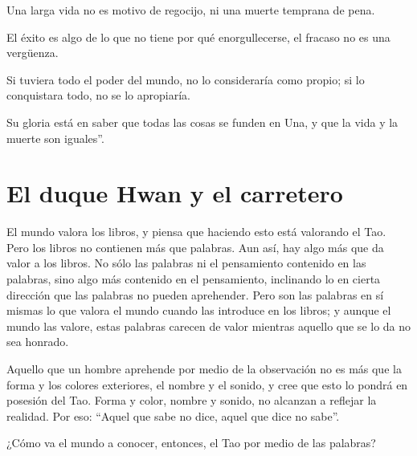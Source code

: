 \documentclass[hidelinks]{memoir}
\begin{document}
	Una larga vida no es motivo de regocijo, ni una muerte temprana de pena.
	
	El éxito es algo de lo que no tiene por qué enorgullecerse, el fracaso
	no es una vergüenza.
	
	Si tuviera todo el poder del mundo, no lo consideraría como propio; si
	lo conquistara todo, no se lo apropiaría.
	
	Su gloria está en saber que todas las cosas se funden en Una, y que la
	vida y la muerte son iguales''.
	
	\chapter*{El duque Hwan y el carretero}
	
	El mundo valora los libros, y piensa que haciendo esto está valorando el
	Tao. Pero los libros no contienen más que palabras. Aun así, hay algo
	más que da valor a los libros. No sólo las palabras ni el pensamiento
	contenido en las palabras, sino algo más contenido en el pensamiento,
	inclinando lo en cierta dirección que las palabras no pueden aprehender.
	Pero son las palabras en sí mismas lo que valora el mundo cuando las
	introduce en los libros; y aunque el mundo las valore, estas palabras
	carecen de valor mientras aquello que se lo da no sea honrado.
	
	Aquello que un hombre aprehende por medio de la observación no es más
	que la forma y los colores exteriores, el nombre y el sonido, y cree que
	esto lo pondrá en posesión del Tao. Forma y color, nombre y sonido, no
	alcanzan a reflejar la realidad. Por eso: ``Aquel que sabe no dice,
	aquel que dice no sabe''.
	
	¿Cómo va el mundo a conocer, entonces, el Tao por medio de las palabras?
	
\end{document}
